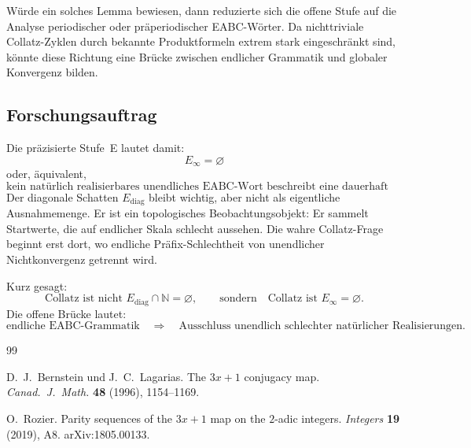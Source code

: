 \documentclass[12pt,a4paper]{article}
\newcommand{\N}{\mathbb{N}}
\newcommand{\Einf}{E_{\infty}}
\newcommand{\Ediag}{E_{\mathrm{diag}}}
\begin{document}
Würde ein solches Lemma bewiesen, dann reduzierte sich die offene Stufe auf die Analyse periodischer oder präperiodischer EABC-Wörter. Da nichttriviale Collatz-Zyklen durch bekannte Produktformeln extrem stark eingeschränkt sind, könnte diese Richtung eine Brücke zwischen endlicher Grammatik und globaler Konvergenz bilden.

\subsection{Forschungsauftrag}

Die präzisierte Stufe~E lautet damit:
\[
\boxed{\Einf=\varnothing}
\]
oder, äquivalent,
\[
\boxed{\text{kein natürlich realisierbares unendliches EABC-Wort beschreibt eine dauerhaft schlechte Bahn.}}
\]
Der diagonale Schatten $\Ediag$ bleibt wichtig, aber nicht als eigentliche Ausnahmemenge. Er ist ein topologisches Beobachtungsobjekt: Er sammelt Startwerte, die auf endlicher Skala schlecht aussehen. Die wahre Collatz-Frage beginnt erst dort, wo endliche Präfix-Schlechtheit von unendlicher Nichtkonvergenz getrennt wird.

\medskip
Kurz gesagt:
\[
\text{Collatz ist nicht }\Ediag\cap\N=\varnothing,
\qquad
\text{sondern}\quad
\text{Collatz ist }\Einf=\varnothing.
\]
Die offene Brücke lautet:
\[
\text{endliche EABC-Grammatik}
\quad\Longrightarrow\quad
\text{Ausschluss unendlich schlechter natürlicher Realisierungen}.
\]

\begin{thebibliography}{99}

D.~J.~Bernstein und J.~C.~Lagarias.
The $3x+1$ conjugacy map.
\textit{Canad.\ J.\ Math.} \textbf{48} (1996), 1154--1169.

O.~Rozier.
Parity sequences of the $3x+1$ map on the $2$-adic integers.
\textit{Integers} \textbf{19} (2019), A8. arXiv:1805.00133.

\end{thebibliography}
\end{document}
